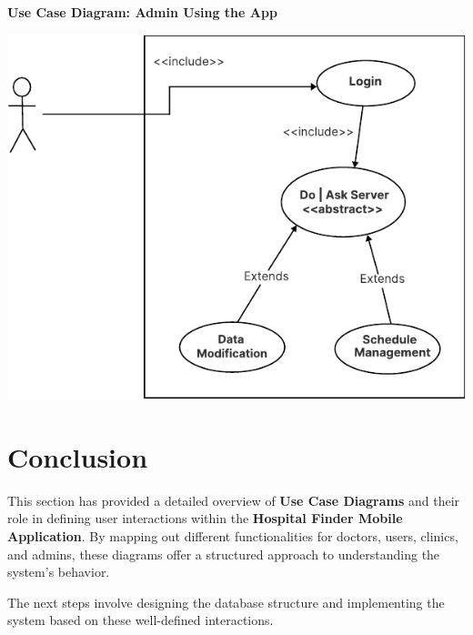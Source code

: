 \documentclass[12pt]{report}
\begin{document}
\vspace{0.5cm}  
\noindent \textbf{Use Case Diagram: Admin Using the App}  
\begin{center}
    \includegraphics[width=\textwidth]{images/doctorCAS.pdf} %
\end{center}

\section{\textbf{Conclusion}}  
\noindent This section has provided a detailed overview of \textbf{Use Case Diagrams} and their role in defining user interactions within the \textbf{Hospital Finder Mobile Application}. By mapping out different functionalities for doctors, users, clinics, and admins, these diagrams offer a structured approach to understanding the system's behavior.  

\noindent The next steps involve designing the database structure and implementing the system based on these well-defined interactions.  
\end{document}
